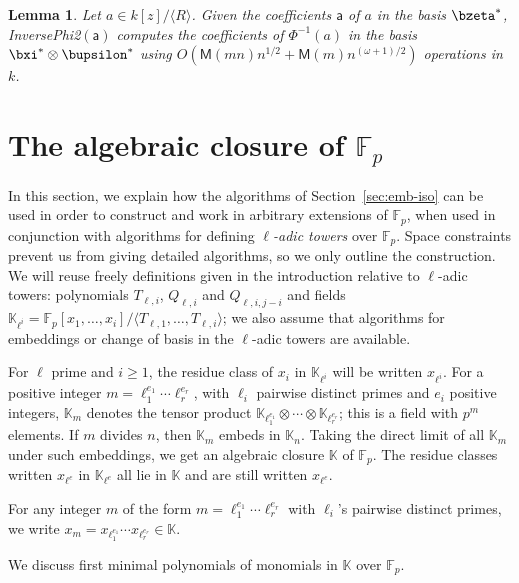 \documentclass{sig-alternate}
\def\M {\ensuremath{\mathsf{M}}}
\def\F {\ensuremath{\mathbb{F}}}
\def\K {\ensuremath{\mathbb{K}}}
\def\va {\ensuremath{\mathsf{a}}}
\newcounter{algo}
\newcommand{\ang}[1]{\langle#1\rangle}
\newtheorem{Lemma}{Lemma}
\begin{document}
\begin{Lemma}\label{lemma:tiso2}
  Let $a\in k[z]/\ang{R}$. Given the coefficients $\va$ of $a$ in the
  basis $\bzeta^\ast$, {\sf InversePhi2}$(\va)$ computes the
  coefficients of $\Phi^{-1}(a)$ in the basis $\bxi^\ast \otimes
  \bupsilon^\ast$ using $O(\M(mn)n^{1/2}+\M(m) n^{(\omega+1)/2} )$
  operations in~$k$.
\end{Lemma}


\section{The algebraic closure of $\F_p$}\label{sec:fpbar}

In this section, we explain how the algorithms of
Section~\ref{sec:emb-iso} can be used in order to construct and work
in arbitrary extensions of $\F_p$, when used in conjunction with
algorithms for defining {\em $\ell$-adic towers} over $\F_p$. Space
constraints prevent us from giving detailed algorithms, so we only
outline the construction. We will reuse freely definitions given in
the introduction relative to $\ell$-adic towers: polynomials
$T_{\ell,i}$, $Q_{\ell,i}$ and $Q_{\ell,i,j-i}$ and fields
$\K_{\ell^i}=\F_p[x_1,\dots,x_i]/\langle
T_{\ell,1},\dots,T_{\ell,i}\rangle$; we also assume that algorithms
for embeddings or change of basis in the $\ell$-adic towers are
available.

\smallskip{} For $\ell$ prime and $i \ge 1$,
the residue class of $x_i$ in $\K_{\ell^i}$ will be written
$x_{\ell^i}$. For a positive integer $m=\ell_1^{e_1}\cdots
\ell_r^{e_r}$, with $\ell_i$ pairwise distinct primes and $e_i$
positive integers, $\K_m$ denotes the tensor product
$\K_{\ell_1^{e_1}} \otimes \cdots \otimes \K_{\ell_r^{e_r}}$; this is
a field with $p^m$ elements.  If $m$ divides $n$, then $\K_m$ embeds
in $\K_n$. Taking the direct limit of all $\K_m$ under such
embeddings, we get an algebraic closure $\K$ of $\F_p$. The residue
classes written $x_{\ell^e}$ in $\K_{\ell^e}$ all lie in $\K$ and are
still written $x_{\ell^e}$.

For any integer $m$ of the form $m=\ell_1^{e_1}\cdots \ell_r^{e_r}$
with $\ell_i$'s pairwise distinct primes, we write $x_m =
x_{\ell_1^{e_1}} \cdots x_{\ell_r^{e_r}} \in \K$.

\smallskip{}  We discuss first
minimal polynomials of monomials in $\K$ over $\F_p$.
\end{document}
